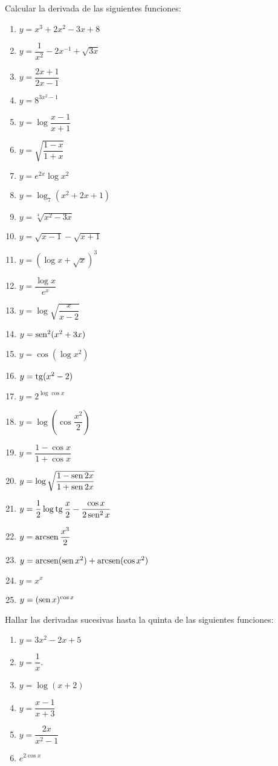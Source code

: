 {Calcular la derivada de las siguientes funciones:
\begin{multicols}{2}
\begin{enumerate}
\item $y=x^3+2x^2-3x+8$
\item $y=\dfrac{1}{x^2}-2x^{-1}+\sqrt{3x}$
\item $y=\dfrac{2x+1}{2x-1}$
\item $y=8^{3x^2-1}$
\item $y=\log \dfrac{x-1}{x+1}$
\item $y=\sqrt{\dfrac{1-x}{1+x}}$
\item $y=e^{2x}\log x^2$
\item $y=\log_7(x^2+2x+1)$
\item $y=\sqrt[4]{x^2-3x}$
\item $y=\sqrt{x-1}-\sqrt{x+1}$
\item $y=(\log x+\sqrt{x})^3$  
\item $y=\dfrac{\log x}{e^x}$
\item $y=\log \sqrt{\dfrac{x}{x-2}}$
\item $y=\operatorname{sen}^2(x^2+3x)$
\item $y=\cos(\log x^2)$
\item $y=\operatorname{tg}(x^2-2)$
\item $y=2^{\log \cos x}$
\item $y=\log\left(\cos\dfrac{x^2}{2}\right)$
\item $y=\dfrac{1-\cos x}{1+\cos x}$
\item $y=\log\sqrt{\dfrac{1-\operatorname{sen} 2x}{1+\operatorname{sen} 2x}}$
\item $y=\dfrac{1}{2}\log \operatorname{tg} \dfrac{x}{2}-\dfrac{\cos x}{2\operatorname{sen}^2 x}$
\item $y=\operatorname{arcsen} \dfrac{x^3}{2}$
\item $y=\operatorname{arcsen}(\operatorname{sen} x^2)+\operatorname{arcsen}(\cos x^2)$
\item $y=x^x$
\item $y=(\operatorname{sen} x)^{\cos x}$
\end{enumerate}
\end{multicols}
}


{Hallar las derivadas sucesivas hasta la quinta de las siguientes funciones:
\begin{multicols}{2}
\begin{enumerate}
\item $y=3x^2-2x+5$
\item $y=\dfrac{1}{x}.$
\item $y=\log(x+2)$
\item $y=\dfrac{x-1}{x+3}$
\item $y=\dfrac{2x}{x^2-1}$
\item $e^{2\cos x}$
\end{enumerate}
\end{multicols}
}


